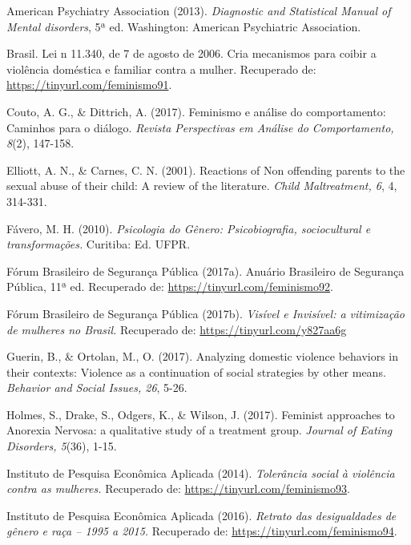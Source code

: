 \hangindent=25pt
\noindent American Psychiatry Association (2013). \textit{Diagnostic and Statistical Manual of Mental disorders}, 5ª ed. Washington: American Psychiatric Association.

\hangindent=25pt
\noindent Brasil. Lei n 11.340, de 7 de agosto de 2006. Cria mecanismos para coibir a violência doméstica e familiar contra a mulher. Recuperado de: \url{https://tinyurl.com/feminismo91}. 

\hangindent=25pt
\noindent Couto, A. G., \& Dittrich, A. (2017). Feminismo e análise do comportamento: Caminhos para o diálogo. \textit{Revista Perspectivas em Análise do Comportamento, 8}(2), 147-158.

\hangindent=25pt
\noindent Elliott, A. N., \& Carnes, C. N. (2001). Reactions of Non offending parents to the sexual abuse of their child: A review of the literature. \textit{Child Maltreatment, 6}, 4, 314-331.

\hangindent=25pt
\noindent Fávero, M. H. (2010). \textit{Psicologia do Gênero: Psicobiografia, sociocultural e transformações.} Curitiba: Ed. UFPR.

\hangindent=25pt
\noindent Fórum Brasileiro de Segurança Pública (2017a). Anuário Brasileiro de Segurança Pública, 11ª ed. Recuperado de: \url{https://tinyurl.com/feminismo92}. 

\hangindent=25pt
\noindent Fórum Brasileiro de Segurança Pública (2017b). \textit{Visível e Invisível: a vitimização de mulheres no Brasil.} Recuperado de: \url{https://tinyurl.com/y827aa6g}

\hangindent=25pt
\noindent Guerin, B., \& Ortolan, M., O. (2017). Analyzing domestic violence behaviors in their contexts: Violence as a continuation of social strategies by other means. \textit{Behavior and Social Issues, 26}, 5-26.

\hangindent=25pt
\noindent Holmes, S., Drake, S., Odgers, K., \& Wilson, J. (2017). Feminist approaches to Anorexia Nervosa: a qualitative study of a treatment group. \textit{Journal of Eating Disorders, 5}(36), 1-15.

\hangindent=25pt
\noindent Instituto de Pesquisa Econômica Aplicada (2014). \textit{Tolerância social à violência contra as mulheres.} Recuperado de: \url{https://tinyurl.com/feminismo93}. 

\hangindent=25pt
\noindent Instituto de Pesquisa Econômica Aplicada (2016). \textit{Retrato das desigualdades de gênero e raça – 1995 a 2015.} Recuperado de: \url{https://tinyurl.com/feminismo94}.


